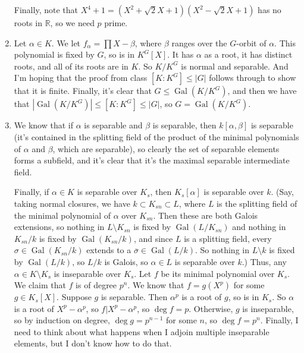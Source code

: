 \documentclass{article}
\newcommand\RR{\mathbb R}
\DeclareMathOperator\Gal{Gal}
\begin{document}
\begin{enumerate}
      Finally, note that $X^4+1 = (X^2 + \sqrt2X + 1)(X^2 - \sqrt2X + 1)$ has no
      roots in $\RR$, so we need $p$ prime.

   \item Let $\alpha \in K$. We let $f_\alpha = \prod X-\beta$, where $\beta$
      ranges over the $G$-orbit of $\alpha$. This polynomial is fixed by $G$, so
      is in $K^G[X]$. It has $\alpha$ as a root, it has distinct roots, and all
      of its roots are in $K$. So $K / K^G$ is normal and separable. And I'm
      hoping that the proof from class $[K:K^G] \leq |G|$ follows through to
      show that it is finite. Finally, it's clear that $G \leq \Gal(K/K^G)$, and
      then we have that $|\Gal(K/K^G)| \leq [K:K^G] \leq |G|$, so $G =
      \Gal(K/K^G)$.

   \item We know that if $\alpha$ is separable and $\beta$ is separable, then
      $k[\alpha,\beta]$ is separable (it's contained in the splitting field of
      the product of the minimal polynomials of $\alpha$ and $\beta$, which are
      separable), so clearly the set of separable elements forms a subfield, and
      it's clear that it's the maximal separable intermediate field.

      Finally, if $\alpha \in K$ is separable over $K_s$, then $K_s[\alpha]$ is
      separable over $k$. (Say, taking normal closures, we have $k \subset
      K_{sn} \subset L$, where $L$ is the splitting field of the minimal
      polynomial of $\alpha$ over $K_{sn}$. Then these are both Galois
      extensions, so nothing in $L \setminus K_{sn}$ is fixed by
      $\Gal(L/K_{sn})$ and nothing in $K_{sn}/k$ is fixed by $\Gal(K_{sn}/k)$,
      and since $L$ is a splitting field, every $\sigma \in \Gal(K_{sn}/k)$
      extends to a $\overline\sigma \in \Gal(L/k)$. So nothing in $L \setminus
      k$ is fixed by $\Gal(L/k)$, so $L/k$ is Galois, so $\alpha \in L$ is
      separable over $k$.) Thus, any $\alpha \in K \setminus K_s$ is inseparable
      over $K_s$. Let $f$ be its minimal polynomial over $K_s$. We claim that
      $f$ is of degree $p^n$. We know that $f = g(X^p)$ for some $g \in K_s[X]$.
      Suppose $g$ is separable. Then $\alpha^p$ is a root of $g$, so is in
      $K_s$. So $\alpha$ is a root of $X^p - \alpha^p$, so $f | X^p - \alpha^p$,
      so $\deg f = p$. Otherwise, $g$ is inseparable, so by induction on degree,
      $\deg g = p^{n-1}$ for some $n$, so $\deg f = p^n$. Finally, I need to
      think about what happens when I adjoin multiple inseparable elements, but
      I don't know how to do that.


\end{enumerate}
\end{document}
